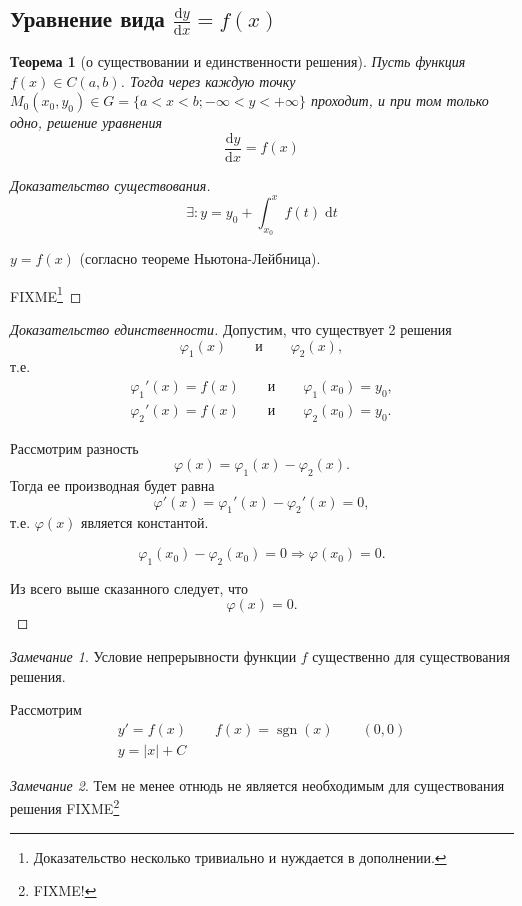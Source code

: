 \documentclass[a4paper,10pt]{report}
\newcommand{\ud}{\mathrm{d}}
\newtheorem{theorem}{Теорема}[section]
\theoremstyle{definition}
\theoremstyle{remark}
\newtheorem{note}{Замечание}[section]
\theoremstyle{plain}
\DeclareMathOperator{\sgn}{sgn}
\begin{document}
\subsection{Уравнение вида $\displaystyle\frac{\ud y}{\ud x} = f(x)$}
\begin{theorem}[о существовании и единственности решения]
 Пусть функция $f(x) \in C(a,b)$. Тогда через каждую точку $M_0(x_0,y_0) \in G = \{a < x < b; -\infty < y < +\infty\}$ проходит, и при том только одно, решение уравнения
 \begin{equation}
  \frac{\ud y}{\ud x} = f(x)
  \label{eq:2_1}
 \end{equation}
\end{theorem}
\begin{proof}[Доказательство существования]
 \[
  \exists: y = y_0 + \int_{x_0}^x f(t)\; \ud t
 \]

 $y = f(x)$ (согласно теореме Ньютона-Лейбница).

 FIXME\footnote{Доказательство несколько тривиально и нуждается в дополнении.}
\end{proof}
\begin{proof}[Доказательство единственности]
 Допустим, что существует 2 решения
 \[
  \varphi_1(x) \qquad \text{и} \qquad \varphi_2(x),
 \]
 т.е.
 \begin{gather*}
  \varphi_1'(x) = f(x) \qquad \text{и} \qquad \varphi_1(x_0) = y_0, \\
  \varphi_2'(x) = f(x) \qquad \text{и} \qquad \varphi_2(x_0) = y_0.
 \end{gather*}

 Рассмотрим разность
 \[
  \varphi(x) = \varphi_1(x) - \varphi_2(x).
 \]
 Тогда ее производная будет равна
 \[
  \varphi'(x) = \varphi_1'(x) - \varphi_2'(x) = 0,
 \]
 т.е. $\varphi(x)$ является константой.

 \[
  \varphi_1(x_0) - \varphi_2(x_0) = 0 \Longrightarrow \varphi(x_0) = 0.
 \]

 Из всего выше сказанного следует, что
 \[
  \varphi(x) = 0.
 \]
\end{proof}
\begin{note}
 Условие непрерывности функции $f$ существенно для существования решения.

 Рассмотрим
 \begin{gather*}
  y' = f(x) \qquad f(x) = \sgn(x) \qquad (0,0) \\
  y = |x| + C
 \end{gather*}
\end{note}
\begin{note}
 Тем не менее отнюдь не является необходимым для существования решения
 FIXME\footnote{FIXME!}
\end{note}
\end{document}
